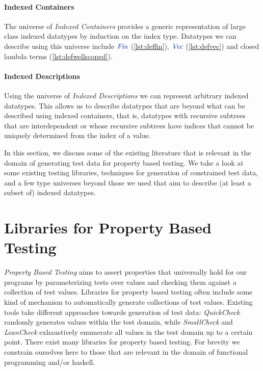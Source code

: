 \documentclass[a4paper,msc,twosized=semi]{uustthesis}
\newcommand*{\mathcolor}{}
\def\mathcolor#1#{\mathcoloraux{#1}}
\newcommand*{\mathcoloraux}[3]{%
  \protect\leavevmode
  \begingroup
    \color#1{#2}#3%
  \endgroup
}
\newcommand{\HSCon}[1]{\mathcolor{hsblue3}{\mathit{#1}}}
\begin{document}
  \paragraph{Indexed Containers}
    The universe of \emph{Indexed Containers} \cite{altenkirch2015indexed} 
    provides a generic representation of large class indexed datatypes by 
    induction on the index type. Datatypes we can describe using this universe 
    include \ensuremath{\HSCon{Fin}} (\cref{lst:deffin}), \ensuremath{\HSCon{Vec}} (\cref{lst:defvec}) and closed 
    lambda terms (\cref{lst:defwellscoped}).

  \paragraph{Indexed Descriptions}
    Using the universe of \emph{Indexed Descriptions} \cite{dagand2013cosmology}
    we can represent arbitrary indexed datatypes. This allows us to describe 
    datatypes that are beyond what can be described using indexed containers, 
    that is, datatypes with recursive subtrees that are interdependent or whose 
    recursive subtrees have indices that cannot be uniquely determined from the 
    index of a value. 

    In this section, we discuss some of the existing literature that is relevant in the 
domain of generating test data for property based testing. We take a look at some 
existing testing libraries, techniques for generation of constrained test data, and a 
few type universes beyond those we used that aim to describe (at least a subset of) 
indexed datatypes. 

\section{Libraries for Property Based Testing}

  \textit{Property Based Testing} aims to assert properties that universally hold for 
  our programs by parameterizing tests over values and checking them against a 
  collection of test values. Libraries for property based testing often include some 
  kind of mechanism to automatically generate collections of test values. Existing 
  tools take different approaches towards generation of test data: \textit{QuickCheck} 
  \cite{claessen2011quickcheck} randomly generates values within the test domain, 
  while \textit{SmallCheck} \cite{runciman2008smallcheck} and \textit{LeanCheck} \cite
  {matela2017tools} exhaustively enumerate all values in the test domain up to a 
  certain point. There exist many libraries for property based testing. For brevity we 
  constrain ourselves here to those that are relevant in the domain of functional 
  programming and/or haskell. 
\end{document}
